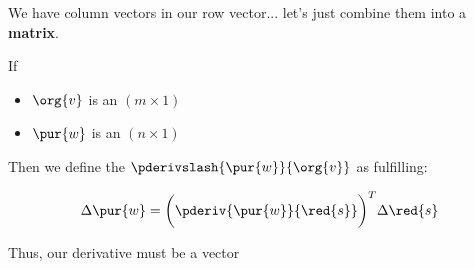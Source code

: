         We have column vectors in our row vector... let's just combine them into a \textbf{matrix}.\\
        
        \begin{definition}
            If 
            \begin{itemize}
                \item $\org{v}$ is an $(m \times 1)$  
                \item $\pur{w}$ is an $(n \times 1)$ 
            \end{itemize}
            
            Then we define the  $\pderivslash{ \pur{w} }{ \org{v} }$ as fulfilling:
            
            \begin{equation*}
                \Delta \pur{w}
                =
                \bigg(
                    \pderiv{ \pur{w} }{ \red{s} } 
                \bigg)^T
                \Delta \red{s}
            \end{equation*}
            
            \boxdiv
            
            Thus, our derivative must be a  vector
            

\end{definition}
